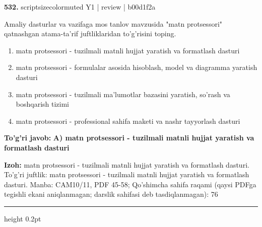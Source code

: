 \documentclass[10pt,a4paper]{article}
\begin{document}
{\bfseries\sffamily\color{ink} 532.} {scriptsizecolor{muted} Y1 | review | b00d1f2a}
\par
Amaliy dasturlar va vazifaga mos tanlov mavzusida "matn protsessori" qatnashgan atama-ta'rif juftliklaridan to'g'risini toping.
\begin{enumerate}[label=\Alph*),leftmargin=9mm]
\item matn protsessori - tuzilmali matnli hujjat yaratish va formatlash dasturi
\item matn protsessori - formulalar asosida hisoblash, model va diagramma yaratish dasturi
\item matn protsessori - tuzilmali ma'lumotlar bazasini yaratish, so'rash va boshqarish tizimi
\item matn protsessori - professional sahifa maketi va nashr tayyorlash dasturi
\end{enumerate}
\begin{tcolorbox}[enhanced,breakable,colback=teal!4,colframe=teal!60!black,boxrule=0.45pt,arc=1.2mm,left=2.7mm,right=2.7mm,top=1.8mm,bottom=1.8mm,before skip=2mm,after skip=2mm]
{\bfseries\sffamily\color{teal}To'g'ri javob:} \textbf{A) matn protsessori - tuzilmali matnli hujjat yaratish va formatlash dasturi}
\par\smallskip
{\bfseries Izoh:} matn protsessori - tuzilmali matnli hujjat yaratish va formatlash dasturi. To'g'ri juftlik: matn protsessori - tuzilmali matnli hujjat yaratish va formatlash dasturi. Manba: CAM10/11, PDF 45-58; Qo'shimcha sahifa raqami (qaysi PDFga tegishli ekani aniqlanmagan; darslik sahifasi deb tasdiqlanmagan): 76
\end{tcolorbox}
\vspace{2mm}\hrule height 0.2pt\vspace{3mm}
\end{document}
